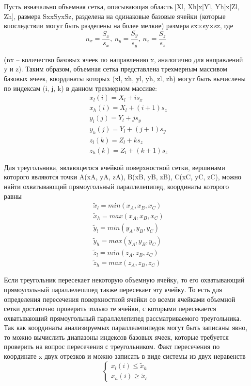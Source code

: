 Пусть изначально объемная сетка, описывающая область [Xl, Xh]x[Yl, Yh]x[Zl, Zh], размера SxxSyxSz,  разделена на одинаковые базовые ячейки (которые впоследствии могут быть разделены на более мелкие) размера sx×sy×sz, где
\begin{equation}
	n_x = \frac{S_x}{s_x}, \ n_y = \frac{S_y}{s_y}, \ n_z = \frac{S_z}{s_z}
\end{equation}

(nx -- количество базовых ячеек по направлению x, аналогично для направлений y и z).
Таким образом, объемная сетка представлена трехмерным массивом базовых ячеек, координаты которых (xl, xh, yl, yh, zl, zh) могут быть вычислены по индексам (i, j, k) в данном трехмерном массиве:
\begin{equation}
	\begin{aligned}
		& x_l(i) = X_l + i s_x \\
		& x_h(i) = X_l + (i + 1) s_x \\
		& y_l(j) = Y_l + j s_y \\
		& y_h(j) = Y_l + (j + 1) s_y \\
		& z_l(k) = Z_l + k s_z \\
		& z_h(k) = Z_l + (k + 1) s_z		
	\end{aligned}
\end{equation}

Для треугольника, являющегося ячейкой поверхностной сетки, вершинами которого являются точки A(xA, yA, zA), B(xB, yB, zB), C(xC, yC, zC), можно найти охватывающий прямоугольный параллелепипед, координаты которого равны
\begin{equation}
	\begin{aligned}
		& \tilde{x}_l = min(x_A, x_B, x_C) \\
		& \tilde{x}_h = max(x_A, x_B, x_C) \\
		& \tilde{y}_l = min(y_A, y_B, y_C) \\
		& \tilde{y}_h = max(y_A, y_B, y_C) \\
		& \tilde{z}_l = min(z_A, z_B, z_C) \\
		& \tilde{z}_h = max(z_A, z_B, z_C)
	\end{aligned}
\end{equation}

Если треугольник пересекает некоторую объемную ячейку, то его охватывающий прямоугольный параллелепипед также пересекает эту ячейку.
То есть для определения пересечения поверхностной ячейки со всеми ячейками объемной сетки достаточно проверить только те ячейки, с которыми пересекается охватывающий прямоугольный параллелепипед рассматриваемого треугольника.
Так как координаты анализируемых параллелепипедов могут быть записаны явно, то можно вычислить диапазоны индексов базовых ячеек, которые требуется проверить на вопрос пересечения с треугольником.
Факт пересечения по координате x двух отрезков и можно записать в виде системы из двух неравенств
\begin{equation}
	\left\{
		\begin{aligned}
			x_l(i) \le \tilde{x}_h \\
			x_h(i) \ge \tilde{x}_l
		\end{aligned}
	\right.
\end{equation}

